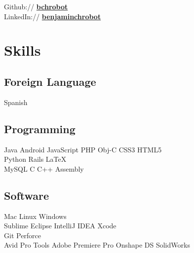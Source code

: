 \documentclass[letterpaper]{deedy-resume} %
\begin{document}
\begin{minipage}[t]{0.33\textwidth}
Github:// \href{https://github.com/bchrobot}{\bf bchrobot} \\
LinkedIn:// \href{https://www.linkedin.com/in/benjaminchrobot/}{\bf benjaminchrobot} \\

\sectionspace %


\section{Skills}

\subsection{Foreign Language}
Spanish \\

\subsection{Programming}

Java \textbullet{}
Android \textbullet{}
JavaScript \textbullet{}
PHP \textbullet{}
Obj-C \textbullet{}
CSS3 \textbullet{}
HTML5 \\
Python \textbullet{}
Rails \textbullet{}
\LaTeX\ \\
MySQL \textbullet{}
C \textbullet{}
C++ \textbullet{}
Assembly \\

\sectionspace %

\subsection{Software}
Mac \textbullet{}
Linux \textbullet{}
Windows \\
Sublime \textbullet{}
Eclipse \textbullet{}
IntelliJ IDEA \textbullet{}
Xcode \\
Git \textbullet{}
Perforce \\
Avid Pro Tools \textbullet{}
Adobe Premiere Pro \textbullet{}
Onshape \textbullet{}
DS SolidWorks \\




\end{minipage}
\end{document}

